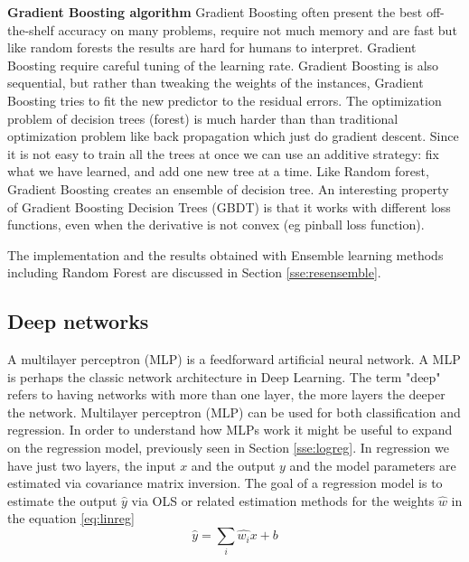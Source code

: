 \documentclass[11pt]{article}
\theoremstyle{definition}
\theoremstyle{remark}
\begin{document}
\textbf{Gradient Boosting algorithm}
Gradient Boosting often present the best off-the-shelf accuracy on many problems, require not much memory and are fast but like random forests the results are hard for humans to interpret. Gradient Boosting require careful tuning of the learning rate.
Gradient Boosting is also sequential, but rather than tweaking the weights of the instances, Gradient Boosting tries to fit the new predictor to the residual errors.
The optimization problem of decision trees (forest) is much harder than than traditional optimization problem like back propagation which just do gradient descent. Since it is not easy to train all the trees at once we can use an additive strategy: fix what we have learned, and add one new tree at a time. 
Like Random forest, Gradient Boosting creates an ensemble of decision tree. An interesting property of Gradient Boosting Decision Trees (GBDT) is that it works with different loss functions, even when the derivative is not convex (eg pinball loss function). 

The implementation and the results obtained with Ensemble learning methods including Random Forest are discussed in Section \ref{sse:resensemble}.

\subsection{Deep networks}
\label{se:deep}

A multilayer perceptron (MLP) is a feedforward artificial neural network. A MLP is perhaps the classic network architecture in Deep Learning. The term "deep" refers to having networks with more than one layer, the more layers the deeper the network.
Multilayer perceptron (MLP) can be used for both classification and regression. In order to understand how MLPs work it might be useful to expand on the regression model, previously seen in Section \ref{sse:logreg}. In regression we have just two layers, the input $x$ and the output $y$ and the model parameters are estimated via covariance matrix inversion. The goal of a regression model is to estimate the output $\hat{y}$ via OLS or related estimation methods for the weights $\hat{w}$ in the equation \ref{eq:linreg}
\begin{equation}
\hat{y} = \sum_i \hat{w_i} x + b
\label{eq:linreg}
\end{equation}
 
\end{document}
